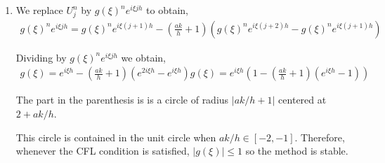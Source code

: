 \documentclass[10pt]{article}
\begin{document}
\begin{solution}[Solution]
\begin{enumerate}[label=(\alph*)]
    \item We replace \( U_j^{n} \) by \( g(\xi)^n e^{i\xi j h} \) to obtain,
        \begin{align*}
            g(\xi)^ne^{i\xi j h} = g(\xi)^n e^{i\xi(j+1)h} - \left( \frac{ak}{h} + 1 \right) \left( g(\xi)^n e^{i\xi(j+2)h} - g(\xi)^n e^{i\xi(j+1)h} \right)
        \end{align*}
       
        Dividing by \( g(\xi)^ne^{i\xi j h} \) we obtain,
        \begin{align*}
            g(\xi) = e^{i\xi h} - \left( \frac{ak}{h} + 1 \right) \left( e^{2i\xi h} - e^{i\xi h} \right)
            g(\xi) = e^{i\xi h}\left(1 - \left( \frac{ak}{h} + 1 \right) \left( e^{i\xi h} - 1 \right) \right)
        \end{align*}
        
        The part in the parenthesis is is a circle of radius \( |ak/h+1| \) centered at \( 2 + ak/h \).

        This circle is contained in the unit circle when \( ak/h \in[-2,-1] \). Therefore, whenever the CFL condition is satisfied, \( |g(\xi)| \leq 1 \) so the method is stable.

\end{enumerate}
\end{solution}


\begin{problem}

\end{problem}


\begin{problem}

\end{problem}


\begin{problem}

\end{problem}


\begin{problem}

\end{problem}


\begin{problem}

\end{problem}


\begin{problem}

\end{problem}


\begin{problem}

\end{problem}


\begin{problem}

\end{problem}


\begin{problem}

\end{problem}
\end{document}

